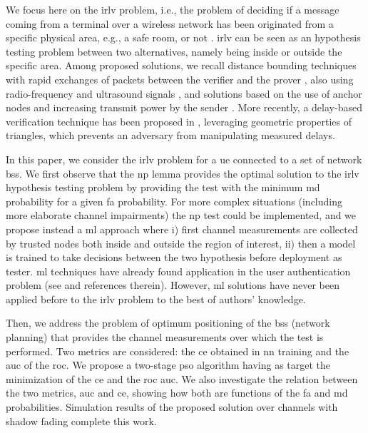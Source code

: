 \documentclass[conference]{IEEEtran}
\begin{document}
We focus here on the \ac{irlv} problem, i.e., the problem of deciding if a message coming from a terminal over a wireless network has been originated from a specific physical area, e.g., a safe room, or not \cite{Zeng-survey}. \ac{irlv} can be seen as an hypothesis testing problem between two alternatives, namely being inside or outside the specific area. Among proposed solutions, we recall distance bounding techniques with rapid exchanges of packets between the verifier and the prover \cite{Brands}, also using radio-frequency and ultrasound signals \cite{Sastry}, and solutions based on the use of anchor nodes and increasing transmit power by the sender \cite{Vora}. More recently, a delay-based verification technique has been proposed  in \cite{7145434}, leveraging geometric properties of triangles, which prevents an adversary from manipulating measured delays.  

In this paper, we consider the \ac{irlv} problem for a \ac{ue} connected to a set of network \acp{bs}. We first observe that the  \ac{np} lemma \cite{Neyman289} provides the optimal solution to the \ac{irlv} hypothesis testing problem by providing  the test with the minimum \ac{md} probability for a given \ac{fa} probability. For more complex situations (including more elaborate channel impairments) the \ac{np} test could be implemented, and we propose instead a \ac{ml} approach  where i) first channel measurements are collected by trusted nodes both inside and outside the region of interest, ii) then a model is trained to take decisions between the two hypothesis before deployment as tester. \ac{ml} techniques have already found application in the user authentication problem (see  \cite{xiao-2018} and references therein). However, \ac{ml} solutions have never been applied before to the \ac{irlv} problem to the best of authors' knowledge. 

Then, we address the problem of optimum positioning of the \acp{bs} (network planning) that provides the channel measurements over which the test is performed. Two metrics are considered: the \ac{ce} obtained in \ac{nn} training and the \ac{auc} of the \ac{roc}. We propose a two-stage \ac{pso} algorithm having as target the  minimization of  the \ac{ce} and  the \ac{roc} \ac{auc}. We also investigate the relation between the two metrics, \ac{auc} and \ac{ce}, showing how both are functions of the \ac{fa} and \ac{md} probabilities. Simulation results of the proposed solution over channels with shadow fading complete this work.

\end{document}
